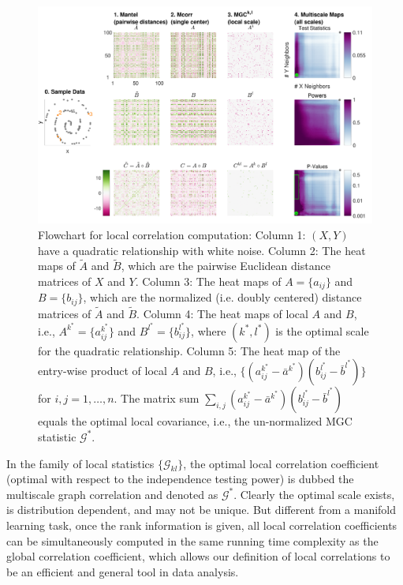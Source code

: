 \documentclass[11pt]{article}
\newcommand{\G}{\mathcal{G}}
\begin{document}
\begin{figure}[htbp]
\includegraphics[width=1.0\textwidth]{Figures/FigA}
\caption{
Flowchart for local correlation computation: Column 1: $(X,Y)$ have a quadratic relationship with white noise. Column 2: The heat maps of $\tilde{A}$ and $\tilde{B}$, which are the pairwise Euclidean distance matrices of $X$ and $Y$. Column 3: The heat maps of $A=\{a_{ij}\}$ and $B=\{b_{ij}\}$, which are the normalized (i.e. doubly centered) distance matrices of $\tilde{A}$ and $\tilde{B}$. Column 4: The heat maps of local $A$ and $B$, i.e., $A^{k^{*}}=\{a^{k^{*}}_{ij}\}$ and $B^{l^{*}}=\{b^{l^{*}}_{ij}\}$, where $(k^{*},l^{*})$ is the optimal scale for the quadratic relationship. Column 5: The heat map of the entry-wise product of local $A$ and $B$, i.e., $\{(a_{ij}^{k^{*}}-\bar{a}^{k^{*}}) (b_{ij}^{l^{*}}-\bar{b}^{l^{*}})\}$ for $i,j=1,\ldots,n$. The matrix sum $\sum_{i,j}(a_{ij}^{k^{*}}-\bar{a}^{k^{*}}) (b_{ij}^{l^{*}}-\bar{b}^{l^{*}})$ equals the optimal local covariance, i.e., the un-normalized MGC statistic $\G^{*}$. }
\label{fig:A}
\end{figure}

In the family of local statistics $\{\G_{kl}\}$, the optimal local correlation coefficient (optimal with respect to the independence testing power) is dubbed the multiscale graph correlation and denoted as $\G^{*}$. Clearly the optimal scale exists, is distribution dependent, and may not be unique. But different from a manifold learning task, once the rank information is given, all local correlation coefficients can be simultaneously computed in the same running time complexity as the global correlation coefficient, which allows our definition of local correlations to be an efficient and general tool in data analysis.
\end{document}
